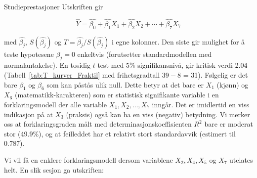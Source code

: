 \begin{eksempel}{Studieprestasjoner}
\noindent Utskriften gir

\[ \hat{Y}=\hat{{\beta}_0}+\hat{{\beta}_1}X_1+ \hat{{\beta}_2}X_2 +
                 \cdots + \hat{{\beta}_7}X_7   \]

\noindent med $\hat{{\beta}_j}$, $S(\hat{{\beta}_j})$ og
 $T = \hat{{\beta}_j}/S(\hat{{\beta}_j})$ i egne kolonner.
Den siste gir mulighet for å teste
hypotesene ${\beta}_j = 0$ enkeltvis (forutsetter standardmodellen med
normalantakelse).  En tosidig $t$-test med 5\% signifikansnivå, gir
kritisk verdi 2.04 (Tabell~\ref{tab:T_kurver_Fraktil} med frihetsgradtall $39-8$ = 31).  Følgelig
er det bare ${\beta}_1$ og ${\beta}_6$ som kan påstås ulik null. 
Dette betyr at det bare er $X_1$ (kjønn) og $X_6$ (matematikk-karakteren)
som er statistisk signifikante variable i en forklaringsmodell der alle
variable $X_1,X_2,\ldots,X_7$ inngår. Det er imidlertid en viss indikasjon
 på at $X_3$ (praksis) også kan ha en viss (negativ) betydning. 
 Vi merker
oss at forklaringsgraden målt med determinasjonskoeffisienten $R^2$
bare er moderat stor (49.9\%), og at feilleddet har et relativt stort
standardavvik (estimert til 0.787).

Vi vil få en enklere forklaringsmodell dersom variablene $X_2,X_4,X_5$
og $X_7$ utelates helt.  En slik sesjon ga utskriften:


\begin{center}  \end{center}


\end{eksempel}
